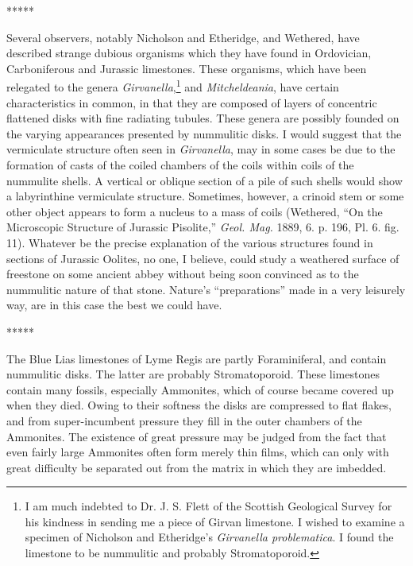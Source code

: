 \documentclass[a4paper, 12pt, oneside]{article}
\begin{document}
\centerline{*\hspace{15mm}*\hspace{15mm}*\hspace{15mm}*\hspace{15mm}*}
\bigskip

Several observers, notably Nicholson and Etheridge, and Wethered, have described strange dubious organisms which they have found in Ordovician, Carboniferous and Jurassic limestones. These organisms, which have been relegated to the genera \emph{Girvanella},\footnote{I am much indebted to Dr. J. S. Flett of the Scottish Geological Survey for his kindness in sending me a piece of Girvan limestone. I wished to examine a specimen of Nicholson and Etheridge's \emph{Girvanella problematica}. I found the limestone to be nummulitic and probably Stromatoporoid.} and \emph{Mitcheldeania}, have certain characteristics in common, in that they are composed of layers of concentric flattened disks with fine radiating tubules. These genera are possibly founded on the varying appearances presented by nummulitic disks. I would suggest that the vermiculate structure often seen in \emph{Girvanella}, may in some cases be due to the formation of casts of the coiled chambers of the coils within coils of the nummulite shells. A vertical or oblique section of a pile of such shells would show a labyrinthine vermiculate structure. Sometimes, however, a crinoid stem or some other object appears to form a nucleus to a mass of coils (Wethered, ``On the Microscopic Structure of Jurassic Pisolite,'' \emph{Geol. Mag.} 1889, 6. p. 196, Pl. 6. fig. 11). Whatever be the precise explanation of the various structures found in sections of Jurassic Oolites, no one, I believe, could study a weathered surface of freestone on some ancient abbey without being soon convinced as to the nummulitic nature of that stone. Nature's ``preparations'' made in a very leisurely way, are in this case the best we could have.

\centerline{*\hspace{15mm}*\hspace{15mm}*\hspace{15mm}*\hspace{15mm}*}
\bigskip

The Blue Lias limestones of Lyme Regis are partly Foraminiferal, and contain nummulitic disks. The latter are probably Stromatoporoid. These limestones contain many fossils, especially Ammonites, which of course became covered up when they died. Owing to their softness the disks are compressed to flat flakes, and from super-incumbent pressure they fill in the outer chambers of the Ammonites. The existence of great pressure may be judged from the fact that even fairly large Ammonites often form merely thin films, which can only with great difficulty be separated out from the matrix in which they are imbedded.
\end{document}
